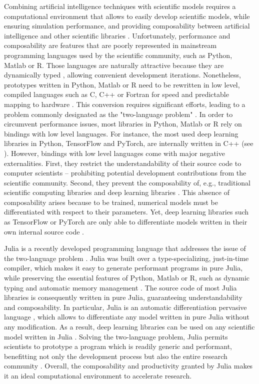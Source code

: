 \label{subsec:Julia}
Combining artificial intelligence techniques with scientific models requires a computational environment that allows to easily develop scientific models, while ensuring simulation performance, and providing composability between artificial intelligence and other scientific libraries \citep{Rackauckas2020}. Unfortunately, performance and composability are features that are poorly represented in mainstream programming languages used by the scientific community, such as Python, Matlab or R.
% 
Those languages are naturally attractive because they are dynamically typed \citep{Bezanson2017}, allowing convenient development iterations. Nonetheless, prototypes written in Python, Matlab or R need to be rewritten in low level, compiled languages such as C, C++ or Fortran for speed and predictable mapping to hardware \citep{Perkel2019,Bezanson2017}. This conversion requires significant efforts, leading to a problem commonly designated as the "two-language problem" \citep{Bezanson2017}.
% 
In order to circumvent performance issues, most libraries in Python, Matlab or R rely on bindings with low level languages. For instance, the most used deep learning libraries in Python, TensorFlow and PyTorch, are internally written in C++ (see \cite{tensorflow,pytorch}). However, bindings with low level languages come with major negative externalities. First, they restrict the understandability of their source code to computer scientists -- prohibiting potential development contributions from the scientific community. Second, they prevent the composability of, e.g., traditional scientific computing libraries and deep learning libraries \citep{Innes2019}. This absence of composability arises because to be trained, numerical models must be differentiated with respect to their parameters. Yet, deep learning libraries such as TensorFlow or PyTorch are only able to differentiate models written in their own internal source code \citep{Innes2019}.

Julia is a recently developed programming language that addresses the issue of the two-language problem \citep{Bezanson2017,Bezanson2018}. Julia was built over a type-specializing, just-in-time compiler, which makes it easy to generate performant programs in pure Julia, while preserving the essential features of Python, Matlab or R, such as dynamic typing and automatic memory management \citep{Perkel2019}. 
% 
The source code of most Julia libraries is consequently written in pure Julia, guaranteeing understandability and composability.
% 
In particular, Julia is an automatic differentiation pervasive language \citep{Innes2019}, which allows to differentiate any model written in pure Julia without any modification. As a result, deep learning libraries can be used on any scientific model written in Julia \citep{Rackauckas2020a}.
% 
Solving the two-language problem, Julia permits scientists to prototype a program which is readily generic and performant, benefitting not only the development process but also the entire research community \citep{Bezanson2017}.
% 
Overall, the composability and productivity granted by Julia makes it an ideal computational environment to accelerate research. 

